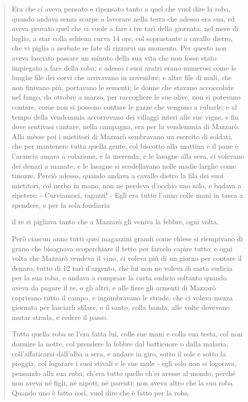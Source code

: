 \documentclass{book}
\newcounter{mar}
\newcommand{\mar}[2]{
\addtocounter{mar}{1}
\hspace{-0.73em}\textsuperscript{\hyperref[\thechapter.\themar]{\themar}}\marginpar{\footnotesize\textbf{\themar}\label{\thechapter.\themar}. #2}\hspace{-0.4em}
}
\newcommand{\mat}[1]{\mar{gg}{#1}}
\begin{document}
\begin{quote}
  Era che ci aveva pensato e ripensato tanto a quel che vuol dire la roba, quando andava senza scarpe a lavorare nella terra che adesso era sua, ed aveva provato quel che ci vuole a fare i tre tarì della giornata, nel mese di luglio, a star colla schiena curva 14 ore, col soprastante a cavallo dietro, che vi piglia a nerbate se fate di rizzarvi un momento. Per questo non aveva lasciato passare un minuto della sua vita che non fosse stato impiegato a fare della roba; e adesso i suoi aratri erano numerosi come le lunghe file dei corvi che arrivavano in novembre; e altre file di muli, che non finivano più, portavano le sementi; le donne che stavano accoccolate nel fango, da ottobre a marzo, per raccogliere le sue olive, non si potevano contare, come non si possono contare le gazze che vengono a rubarle; e al tempo della vendemmia accorrevano dei villaggi interi alle sue vigne, e fin dove sentivasi cantare, nella campagna, era per la vendemmia di Mazzarò. Alla mèsse poi i mietitori di Mazzarò sembravano un esercito di soldati, che per mantenere tutta quella gente, col biscotto alla mattina e il pane e l'arancia amara a colazione, e la merenda, e le lasagne alla sera, ci volevano dei denari a manate, e le lasagne si scodellavano nelle madie larghe come tinozze. Perciò adesso, quando andava a cavallo dietro la fila dei suoi mietitori, col nerbo in mano, non ne perdeva d'occhio uno solo, e badava a ripetere: - Curviamoci, ragazzi! - Egli era tutto l'anno colle mani in tasca a spendere, e per la sola fondiaria\mat{irruzione della storia} il re si pigliava tanto che a Mazzarò gli veniva la febbre, ogni volta.
  
  Però ciascun anno tutti quei magazzini grandi come chiese si riempivano di grano che bisognava scoperchiare il tetto per farcelo capire tutto; e ogni volta che Mazzarò vendeva il vino, ci voleva più di un giorno per contare il denaro, tutto di 12 tarì d'argento, ché lui non ne voleva di carta sudicia per la sua roba, e andava a comprare la carta sudicia soltanto quando aveva da pagare il re, o gli altri; e alle fiere gli armenti di Mazzarò coprivano tutto il campo, e ingombravano le strade, che ci voleva mezza giornata per lasciarli sfilare, e il santo, colla banda, alle volte dovevano mutar strada, e cedere il passo.
  
  Tutta quella roba se l'era fatta lui, colle sue mani e colla sua testa, col non dormire la notte, col prendere la febbre dal batticuore o dalla malaria, coll'affaticarsi dall'alba a sera, e andare in giro, sotto il sole e sotto la pioggia, col logorare i suoi stivali e le sue mule - egli solo non si logorava, pensando alla sua roba, ch'era tutto quello ch'ei avesse al mondo; perché non aveva né figli, né nipoti, né parenti; non aveva altro che la sua roba. Quando uno è fatto così, vuol dire che è fatto per la roba.
  

\end{quote}
\end{document}
